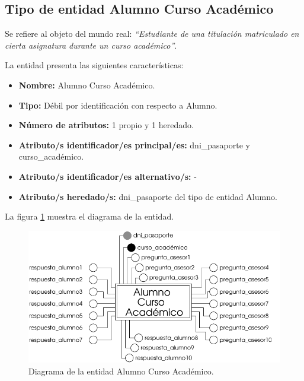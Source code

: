 \subsection{Tipo de entidad Alumno Curso Académico}

   \begin{description}

   \item[Definición] Se refiere al objeto del mundo real: \emph{``Estudiante de
   una titulación matriculado en cierta asignatura durante un curso académico''}.

   \item[Características] La entidad presenta las siguientes características:
      \begin{itemize}
         \item \textbf{Nombre:} Alumno Curso Académico.
         \item \textbf{Tipo:} Débil por identificación con respecto a Alumno.
         \item \textbf{Número de atributos:} 1 propio y 1 heredado.
         \item \textbf{Atributo/s identificador/es principal/es:} dni\_pasaporte y \\curso\_académico.
         \item \textbf{Atributo/s identificador/es alternativo/s:} -
         \item \textbf{Atributo/s heredado/s:} dni\_pasaporte del tipo
         de entidad Alumno.
      \end{itemize}

   \item[Diagrama] La figura \ref{diagramaAlumnoCA} muestra el diagrama de la entidad.
   \item \begin{figure}[!ht]
            \begin{center}
            \includegraphics[]{07.Modelo_Entidad-Interrelacion/7.2.Analisis_Entidades/diagramas/alumnoca.pdf}
            \caption{Diagrama de la entidad Alumno Curso Académico.}
            \label{diagramaAlumnoCA}
            \end{center}
         \end{figure}


\end{description}
